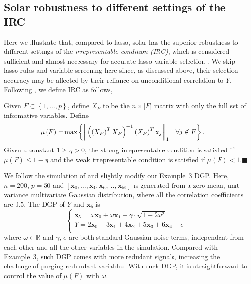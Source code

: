 \documentclass[12pt]{article}
\begin{document}

\subsection{Solar robustness to different settings of the IRC \label{subsection:irc}}

Here we illustrate that, compared to lasso, solar has the superior robustness to different settings of the \emph{irrepresentable condition (IRC)}, which is considered sufficient and almost neccessary for accurate lasso variable selection \citep{zhang09}. We skip lasso rules and variable screening here since, as discussed above, their selection accuracy may be affected by their reliance on unconditional correlation to $Y$. Following \citet{zhang09}, we define IRC as follows,

\begin{definition}[IRC]
  Given $F \subset \left\{ 1, \ldots, p \right\}$, define $X_F$ to be the $n \times \left\vert F \right \vert$ matrix with only the full set of informative variables. Define
    \begin{align}
    \mu \left( F \right) = & \max \left\{ \left\Vert \left( \left( X_F \right)^T X_F \right)^{-1} \left( X_F \right)^T \mathbf{x}_j \right\Vert_1 \; \vert \; \forall j \not\in F \right\}. \notag
    \end{align}
  Given a constant $1 \geqslant \eta > 0$, the strong irrepresentable condition is satisfied if $\mu \left( F \right) \leqslant 1 - \eta$ and the weak irrepresentable condition is satisfied if $\mu \left( F \right) < 1$.$\blacksquare$
\end{definition}

\smallskip
We follow the simulation of \citet{zhaoyu06} and slightly modify our Example~3 DGP. Here, $n = 200$, $p = 50$ and $[\mathbf{x}_0, \ldots, \mathbf{x}_4, \mathbf{x}_6, \ldots, \mathbf{x}_{50}]$ is generated from a zero-mean, unit-variance multivariate Gaussian distribution, where all the correlation coefficients are $0.5$. The DGP of $Y$ and $\mathbf{x}_5$ is
\begin{equation}
	\begin{cases}
    \mathbf{x}_5 = \omega \mathbf{x}_0 + \omega \mathbf{x}_1 + \gamma\cdot \sqrt{1 - 2\omega^2} \\
    Y = 2 \mathbf{x}_0 + 3\mathbf{x}_1 + 4 \mathbf{x}_2 + 5 \mathbf{x}_3 + 6 \mathbf{x}_4 + e \\
	\end{cases}
	\label{eqn:dgp_x5}
\end{equation}
%
where $\omega \in \mathbb{R}$ and $\gamma$, $e$ are both standard Gaussian noise terms, independent from each other and all the other variables in the simulation. Compared with Example~3, such DGP comes with more redudant signals, increasing the challenge of purging redundant variables. With such DGP, it is straightforward to control the value of $\mu \left( F \right)$ with $\omega$.
\end{document}
